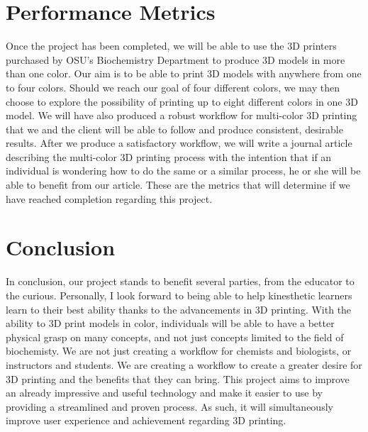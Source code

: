 \documentclass[onecolumn, draftclsnofoot,10pt, compsoc]{IEEEtran}
\begin{document}
\section{Performance Metrics}
Once the project has been completed, we will be able to use the 3D printers purchased by OSU's Biochemistry Department to produce 3D models in more than one color.
Our aim is to be able to print 3D models with anywhere from one to four colors. 
Should we reach our goal of four different colors, we may then choose to explore the possibility of printing up to eight different colors in one 3D model. 
We will have also produced a robust workflow for multi-color 3D printing that we and the client will be able to follow and produce consistent, desirable results. 
After we produce a satisfactory workflow, we will write a journal article describing the multi-color 3D printing process with the intention that if an individual is wondering how to do the same or a similar process, he or she will be able to benefit from our article. 
These are the metrics that will determine if we have reached completion regarding this project. 

\section{Conclusion}
In conclusion, our project stands to benefit several parties, from the educator to the curious. 
Personally, I look forward to being able to help kinesthetic learners learn to their best ability thanks to the advancements in 3D printing. 
With the ability to 3D print models in color, individuals will be able to have a better physical grasp on many concepts, and not just concepts limited to the field of biochemisty.
We are not just creating a workflow for chemists and biologists, or instructors and students.
We are creating a workflow to create a greater desire for 3D printing and the benefits that they can bring. 
This project aims to improve an already impressive and useful technology and make it easier to use by providing a streamlined and proven process.
As such, it will simultaneously improve user experience and achievement regarding 3D printing. 
\end{document}
